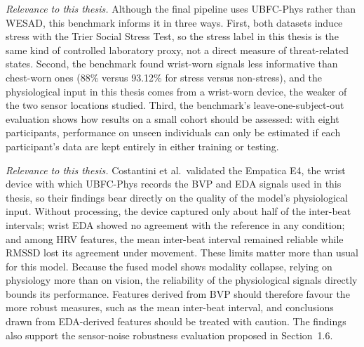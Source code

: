

\textit{Relevance to this thesis.} Although the final pipeline uses UBFC-Phys rather than WESAD, this benchmark informs it in three ways. First, both datasets induce stress with the Trier Social Stress Test, so the stress label in this thesis is the same kind of controlled laboratory proxy, not a direct measure of threat-related states. Second, the benchmark found wrist-worn signals less informative than chest-worn ones (88\% versus 93.12\% for stress versus non-stress), and the physiological input in this thesis comes from a wrist-worn device, the weaker of the two sensor locations studied. Third, the benchmark's leave-one-subject-out evaluation shows how results on a small cohort should be assessed: with eight participants, performance on unseen individuals can only be estimated if each participant's data are kept entirely in either training or testing.


\textit{Relevance to this thesis.} Costantini et al.\ validated the Empatica E4, the wrist device with which UBFC-Phys records the BVP and EDA signals used in this thesis, so their findings bear directly on the quality of the model's physiological input. Without processing, the device captured only about half of the inter-beat intervals; wrist EDA showed no agreement with the reference in any condition; and among HRV features, the mean inter-beat interval remained reliable while RMSSD lost its agreement under movement. These limits matter more than usual for this model. Because the fused model shows modality collapse, relying on physiology more than on vision, the reliability of the physiological signals directly bounds its performance. Features derived from BVP should therefore favour the more robust measures, such as the mean inter-beat interval, and conclusions drawn from EDA-derived features should be treated with caution. The findings also support the sensor-noise robustness evaluation proposed in Section~1.6.


